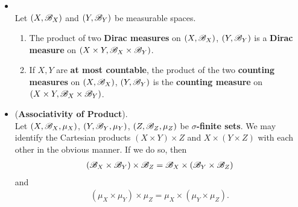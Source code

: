 \documentclass[11pt]{article}
\begin{document}
\begin{itemize}
\item \begin{proposition}\citep{tao2011introduction}\\
Let  $(X, {\mathscr B}_X)$ and $(Y, {\mathscr B}_Y)$ be measurable spaces.
\begin{enumerate}
\item The product of two \textbf{Dirac measures} on $(X, {\mathscr B}_X)$,  $(Y, {\mathscr B}_Y)$ is a \textbf{Dirac measure} on $(X \times Y, {\mathscr B}_X \times {\mathscr B}_Y)$.

\item If $X, Y$ are \textbf{at most countable}, the product of the two \textbf{counting measures} on $(X, {\mathscr B}_X)$,  $(Y, {\mathscr B}_Y)$ is the \textbf{counting measure} on $(X \times Y, {\mathscr B}_X \times {\mathscr B}_Y)$.
\end{enumerate}
\end{proposition}

\item \begin{proposition} (\textbf{Associativity of Product}). \citep{tao2011introduction}\\
Let $(X, {\mathscr B}_X, \mu_X)$, $(Y, {\mathscr B}_Y, \mu_Y)$, $(Z, {\mathscr B}_Z, \mu_Z)$ be \textbf{$\sigma$-finite sets}. We may identify the Cartesian products
$(X \times Y) \times Z$ and $X \times (Y \times Z)$ with each other in the obvious manner. If we do so, then 
\begin{align*}
 ({\mathscr B}_X \times {\mathscr B}_Y) \times {\mathscr B}_Z = {\mathscr B}_X \times ({\mathscr B}_Y \times {\mathscr B}_Z) 
\end{align*}
and
\begin{align*}
(\mu_X \times \mu_Y ) \times \mu_Z = \mu_X \times (\mu_Y \times \mu_Z).
\end{align*}
\end{proposition}
\end{itemize}
\end{document}
